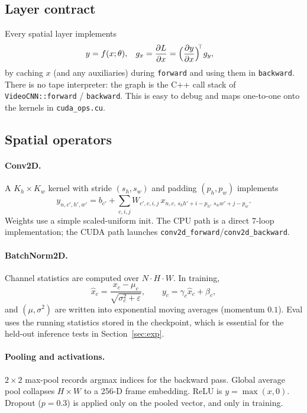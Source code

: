\documentclass[11pt,a4paper]{article}
\begin{document}
\subsection{Layer contract}

Every spatial layer implements
\begin{align*}
  y &= f(x;\theta), &
  g_x &= \frac{\partial L}{\partial x}
       = \Bigl(\frac{\partial y}{\partial x}\Bigr)^{\!\!\top} g_y,
\end{align*}
by caching $x$ (and any auxiliaries) during \texttt{forward} and using
them in \texttt{backward}.
There is no tape interpreter: the graph is the C++ call stack of
\texttt{VideoCNN::forward} / \texttt{backward}.
This is easy to debug and maps one-to-one onto the kernels in
\texttt{cuda\_ops.cu}.

\subsection{Spatial operators}

\paragraph{Conv2D.}
A $K_h\times K_w$ kernel with stride $(s_h,s_w)$ and padding $(p_h,p_w)$
implements
\[
  y_{n,c',h',w'}
  = b_{c'} + \sum_{c,i,j} W_{c',c,i,j}\,
    x_{n,c,\,s_h h'+i-p_h,\,s_w w'+j-p_w}.
\]
Weights use a simple scaled-uniform init.
The CPU path is a direct 7-loop implementation; the CUDA path launches
\texttt{conv2d\_forward}/\texttt{conv2d\_backward}.

\paragraph{BatchNorm2D.}
Channel statistics are computed over $N\cdot H\cdot W$.
In training,
\[
  \hat x_c = \frac{x_c-\mu_c}{\sqrt{\sigma_c^2+\varepsilon}},\qquad
  y_c = \gamma_c\hat x_c + \beta_c,
\]
and $(\mu,\sigma^2)$ are written into exponential moving averages
(momentum $0.1$).
Eval uses the running statistics stored in the checkpoint, which is
essential for the held-out inference tests in Section~\ref{sec:exp}.

\paragraph{Pooling and activations.}
$2\times 2$ max-pool records argmax indices for the backward pass.
Global average pool collapses $H\times W$ to a 256-D frame embedding.
ReLU is $y=\max(x,0)$.
Dropout ($p=0.3$) is applied only on the pooled vector, and only in
training.
\end{document}
